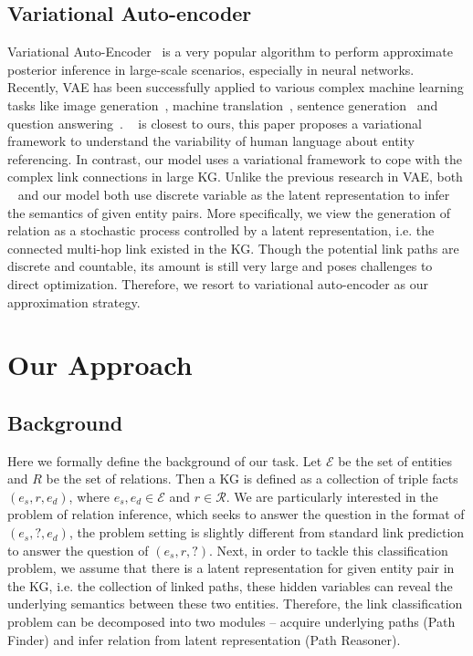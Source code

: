 \documentclass[11pt,a4paper]{article}
\begin{document}
\subsection{Variational Auto-encoder}
Variational Auto-Encoder~\cite{kingma2013auto} is a very popular algorithm to perform approximate posterior inference in large-scale scenarios, especially in neural networks. Recently, VAE has been successfully applied to various complex machine learning tasks like image generation~\cite{mansimov2015generating}, machine translation~\cite{zhang2016variational}, sentence generation~\cite{guu2017generating} and question answering~\cite{zhang2017variational}. ~\citet{zhang2017variational} is closest to ours, this paper proposes a variational framework to understand the variability of human language about entity referencing. In contrast, our model uses a variational framework to cope with the complex link connections in large KG. Unlike the previous research in VAE, both ~\citet{zhang2017variational} and our model both use discrete variable as the latent representation to infer the semantics of given entity pairs. More specifically, we view the generation of relation as a stochastic process controlled by a latent representation, i.e. the connected multi-hop link existed in the KG. Though the potential link paths are discrete and countable, its amount is still very large and poses challenges to direct optimization. Therefore, we resort to variational auto-encoder as our approximation strategy.

\section{Our Approach}
\label{sec:model}
\subsection{Background}
Here we formally define the background of our task. Let $\mathcal{E}$ be the set of entities and $R$ be the set of relations. Then a KG is defined as a collection of triple facts $(e_s, r, e_d)$, where $e_s, e_d \in \mathcal{E}$ and $r \in \mathcal{R}$. We are particularly interested in the problem of relation inference, which seeks to answer the question in the format of $(e_s, ?, e_d)$, the problem setting is slightly different from standard link prediction to answer the question of $(e_s, r, ?)$. Next, in order to tackle this classification problem, we assume that there is a latent representation for given entity pair in the KG, i.e. the collection of linked paths, these hidden variables can reveal the underlying semantics between these two entities. Therefore, the link classification problem can be decomposed into two modules -- acquire underlying paths (Path Finder) and infer relation from latent representation (Path Reasoner).
\end{document}
